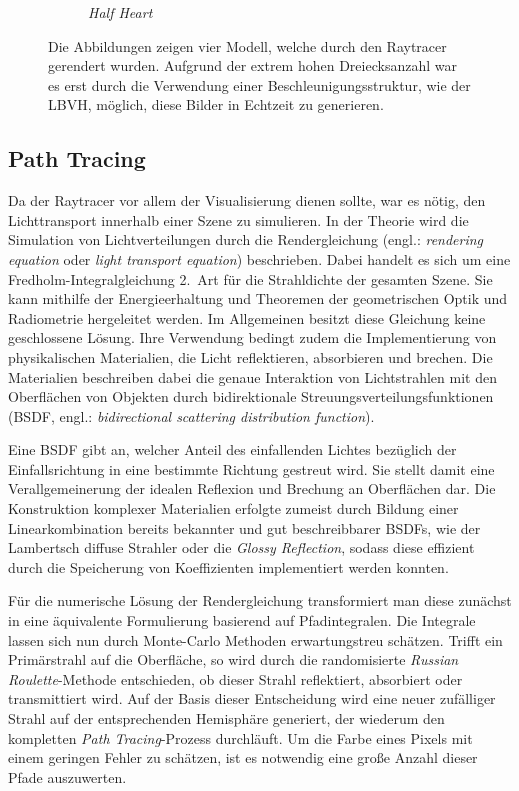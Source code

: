 \documentclass[crop=false]{standalone}
\begin{document}
\begin{figure}[h]
\begin{subfigure}[b]{0.24\textwidth}
          \caption{\textit{Half Heart}}
        \end{subfigure}
        \caption{%
          Die Abbildungen zeigen vier Modell, welche durch den Raytracer gerendert wurden.
          Aufgrund der extrem hohen Dreiecksanzahl war es erst durch die Verwendung einer Beschleunigungsstruktur, wie der LBVH, möglich, diese Bilder in Echtzeit zu generieren.
        }
        \label{fig:lbvh-results}
      \end{figure}


    \subsection{Path Tracing} %
    \label{sub:path_tracing}
      Da der Raytracer vor allem der Visualisierung dienen sollte, war es nötig, den Lichttransport innerhalb einer Szene zu simulieren.
      In der Theorie wird die Simulation von Lichtverteilungen durch die Rendergleichung (engl.: \textit{rendering equation} oder \textit{light transport equation}) beschrieben.
      Dabei handelt es sich um eine Fredholm-Integralgleichung 2.~Art für die Strahldichte der gesamten Szene.
      Sie kann mithilfe der Energieerhaltung und Theoremen der geometrischen Optik und Radiometrie hergeleitet werden.
      Im Allgemeinen besitzt diese Gleichung keine geschlossene Lösung.
      Ihre Verwendung bedingt zudem die Implementierung von physikalischen Materialien, die Licht reflektieren, absorbieren und brechen.
      Die Materialien beschreiben dabei die genaue Interaktion von Lichtstrahlen mit den Oberflächen von Objekten durch bidirektionale Streuungsverteilungsfunktionen (BSDF, engl.: \textit{bidirectional scattering distribution function}).

      Eine BSDF gibt an, welcher Anteil des einfallenden Lichtes bezüglich der Einfallsrichtung in eine bestimmte Richtung gestreut wird.
      Sie stellt damit eine Verallgemeinerung der idealen Reflexion und Brechung an Oberflächen dar.
      Die Konstruktion komplexer Materialien erfolgte zumeist durch Bildung einer Linearkombination bereits bekannter und gut beschreibbarer BSDFs, wie der Lambertsch diffuse Strahler oder die \textit{Glossy Reflection}, sodass diese effizient durch die Speicherung von Koeffizienten implementiert werden konnten.

      Für die numerische Lösung der Rendergleichung transformiert man diese zunächst in eine äquivalente Formulierung basierend auf Pfadintegralen.
      Die Integrale lassen sich nun durch Monte-Carlo Methoden erwartungstreu schätzen.
      Trifft ein Primärstrahl auf die Oberfläche, so wird durch die randomisierte \textit{Russian Roulette}-Methode entschieden, ob dieser Strahl reflektiert, absorbiert oder transmittiert wird.
      Auf der Basis dieser Entscheidung wird eine neuer zufälliger Strahl auf der entsprechenden Hemisphäre generiert, der wiederum den kompletten \textit{Path Tracing}-Prozess durchläuft.
      Um die Farbe eines Pixels mit einem geringen Fehler zu schätzen, ist es notwendig eine große Anzahl dieser Pfade auszuwerten.
\end{document}
